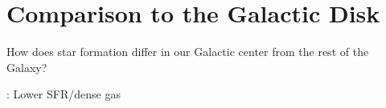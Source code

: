 \section{Comparison to the Galactic Disk}
How does star formation differ in our Galactic center from the rest of the Galaxy? 

\citet{Longmore2013a}: Lower SFR/dense gas

